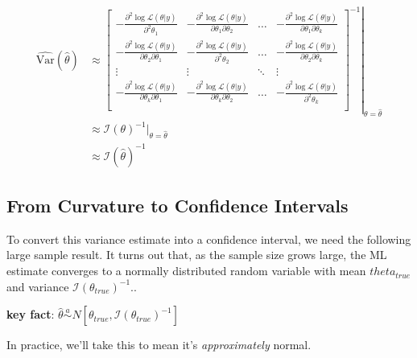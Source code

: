 \documentclass[
]{book}
\begin{document}
\[
\begin{equation*}
\begin{aligned}
\widehat{\text{Var}}(\hat{\theta}) &\approx \left. \left[ 
\displaystyle \begin{matrix}
- \frac{\partial^2 \log \mathcal{L}(\theta| y)}{\partial^2 \theta_1} & - \frac{\partial^2 \log \mathcal{L}(\theta| y)}{\partial \theta_1 \partial \theta_2} & \ldots &- \frac{\partial^2 \log \mathcal{L}(\theta| y)}{\partial \theta_1 \partial \theta_k}\\
- \frac{\partial^2 \log \mathcal{L}(\theta| y)}{\partial \theta_2 \partial \theta_1} & - \frac{\partial^2 \log \mathcal{L}(\theta| y)}{\partial^2 \theta_2} & \ldots & - \frac{\partial^2 \log \mathcal{L}(\theta| y)}{\partial \theta_2 \partial \theta_k}\\
\vdots & \vdots & \ddots & \vdots \\
- \frac{\partial^2 \log \mathcal{L}(\theta| y)}{\partial \theta_k \partial \theta_1}     & - \frac{\partial^2 \log \mathcal{L}(\theta| y)}{\partial \theta_k \partial \theta_2} & \ldots & - \frac{\partial^2 \log \mathcal{L}(\theta| y)}{\partial^2 \theta_k}\\
\end{matrix}\right]^{-1} \right|_{\theta = \hat{\theta}}\\
 & \approx \mathcal{I}(\theta)^{-1}|_{\theta = \hat{\theta}}\\
 &\approx \mathcal{I}(\hat{\theta})^{-1}
\end{aligned}
\end{equation*}
\]

\hypertarget{from-curvature-to-confidence-intervals}{%
\subsection{From Curvature to Confidence
Intervals}\label{from-curvature-to-confidence-intervals}}

To convert this variance estimate into a confidence interval, we need
the following large sample result. It turns out that, as the sample size
grows large, the ML estimate converges to a normally distributed random
variable with mean \(theta_{true}\) and variance
\(\mathcal{I}(\theta_{true})^{-1}\)..

\textbf{key fact}:
\(\hat{\theta} \overset{a}{\sim} N\left[ \theta_{true}, \mathcal{I}(\theta_{true})^{-1}\right]\)

\pause In practice, we'll take this to mean it's \emph{approximately}
normal.
\end{document}
